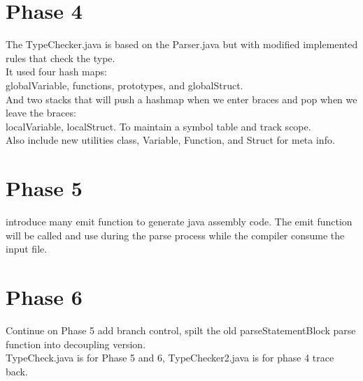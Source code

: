 \documentclass{article}
\begin{document}
    \section{Phase 4}
    The TypeChecker.java is based on the Parser.java but with modified implemented rules that check the type.\\
    It used four hash maps:\\
    globalVariable, functions, prototypes, and globalStruct.\\
    And two stacks that will push a hashmap when we enter braces and pop when we leave the braces:\\
    localVariable, localStruct.
    To maintain a symbol table and track scope. \\
    Also include new utilities class, Variable, Function, and Struct for meta info.

    \section{Phase 5}
    introduce many emit function to generate java assembly code. The emit function will be called and use during the parse process while the compiler consume the input file.\\

    \section{Phase 6}
    Continue on Phase 5 add branch control, spilt the old parseStatementBlock parse function into decoupling version.\\
    TypeCheck.java is for Phase 5 and 6, TypeChecker2.java is for phase 4 trace back.\\
\end{document}
